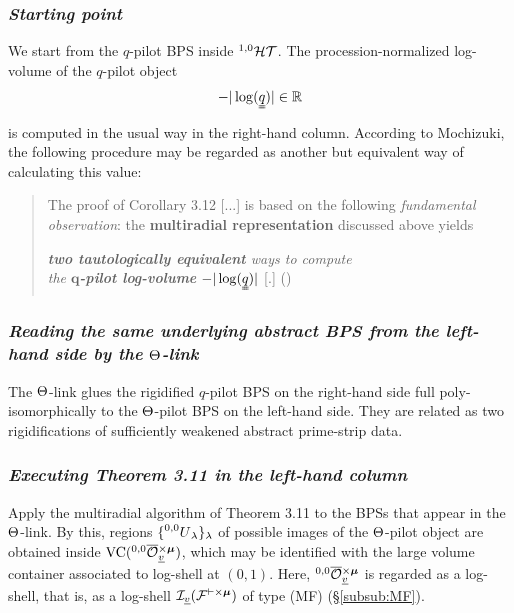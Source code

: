 \documentclass[12pt, reqno, a4paper]{amsart}
\def\udl#1{\underline{#1}} %
\def\bR{\mathbb{R}} %
\def\uv{\udl{v}} %
\DeclareMathOperator{\VC}{VC}
\begin{document}
\subsubsection{\emph{Starting point}}\label{subsub:startingPoint}

We start from the \(q\)-pilot BPS inside \(\HT[1,0]\).
The procession-normalized log-volume of the \(q\)-pilot object
\[
  -|\log(\uuqq)|\in\bR
\]
is computed in the usual way in the right-hand column. According to Mochizuki, the following procedure may be regarded as another but equivalent way of calculating this value:

\begin{quote}
The proof of Corollary 3.12 [...] is based on the
following {\it fundamental observation}: the {\bf multiradial
representation} discussed above yields  
\smallskip
\begin{center}
    {\it {\bf two tautologically equivalent} ways to compute}\\
    {\it the {\bf $\bm{q}$-pilot log-volume} $-|\log(\uuqq)|$} [.] (\cite[p.\ 421]{MR4225475})
\end{center}
\end{quote}


\subsubsection{\emph{Reading the same underlying abstract BPS from the left-hand side by the \(\Th\)-link}}\label{subsub:fromLeft}
The \(\Th\)-link glues the rigidified \(q\)-pilot BPS on the right-hand side full poly-isomorphically to the \(\Th\)-pilot BPS on the left-hand side.
They are related as two rigidifications of sufficiently weakened abstract prime-strip data.

\subsubsection{\emph{Executing Theorem 3.11 in the left-hand column}}
Apply the multiradial algorithm of Theorem 3.11 to the BPSs that appear in the \(\Th\)-link.  
By this, regions $\{\prescript{0,0}{}{U}_{\lambda}\}_{\lambda}$ of possible images of the \(\Th\)-pilot object are obtained inside $\VC(\oOOxmu[0,0]_{\uv})$, which may be identified with the large volume container associated to log-shell at $(0, 1)$.
Here, $\oOOxmu[0,0]_{\uv}$ is regarded as a log-shell, that is, as a log-shell $\LS_{\uv}(\cFvxmu)$ of type (MF) (\S\ref{subsub:MF}).
\end{document}
